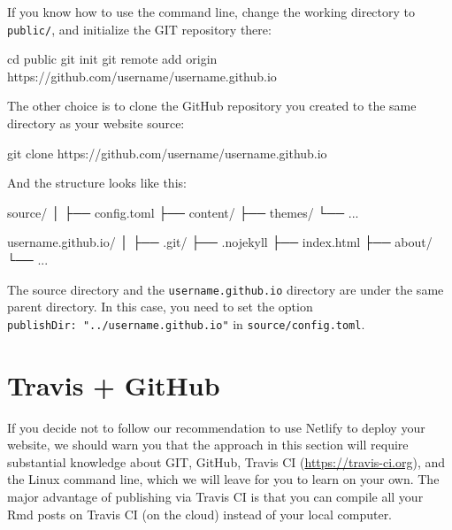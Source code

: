 \documentclass[12pt,]{krantz}
\makeatletter
\newenvironment{Shaded}{\begin{snugshade}}{\end{snugshade}}
\newcommand{\BuiltInTok}[1]{#1}
\newcommand{\ExtensionTok}[1]{#1}
\newcommand{\FunctionTok}[1]{\textcolor[rgb]{0.00,0.00,0.00}{#1}}
\newcommand{\NormalTok}[1]{#1}
\newenvironment{kframe}{%
\medskip{}
\setlength{\fboxsep}{.8em}
 \def\at@end@of@kframe{}%
 \ifinner\ifhmode%
  \def\at@end@of@kframe{\end{minipage}}%
  \begin{minipage}{\columnwidth}%
 \fi\fi%
 \def\FrameCommand##1{\hskip\@totalleftmargin \hskip-\fboxsep
 \colorbox{shadecolor}{##1}\hskip-\fboxsep
     \hskip-\linewidth \hskip-\@totalleftmargin \hskip\columnwidth}%
 \MakeFramed {\advance\hsize-\width
   \@totalleftmargin\z@ \linewidth\hsize
   \@setminipage}}%
 {\par\unskip\endMakeFramed%
 \at@end@of@kframe}
\renewenvironment{Shaded}{\begin{kframe}}{\end{kframe}}
\theoremstyle{definition}
\theoremstyle{definition}
\theoremstyle{definition}
\theoremstyle{remark}
\makeatother
\begin{document}
If you know how to use the command line, change the working directory to
\texttt{public/}, and initialize the GIT repository there:

\begin{Shaded}
\begin{Highlighting}[]
\BuiltInTok{cd}\NormalTok{ public}
\FunctionTok{git}\NormalTok{ init}
\FunctionTok{git}\NormalTok{ remote add origin https://github.com/username/username.github.io}
\end{Highlighting}
\end{Shaded}

The other choice is to clone the GitHub repository you created to the
same directory as your website source:

\begin{Shaded}
\begin{Highlighting}[]
\FunctionTok{git}\NormalTok{ clone https://github.com/username/username.github.io}
\end{Highlighting}
\end{Shaded}

And the structure looks like this:

\begin{Shaded}
\begin{Highlighting}[]
\ExtensionTok{source/}
\NormalTok{│}
\NormalTok{├── }\ExtensionTok{config.toml}
\NormalTok{├── }\ExtensionTok{content/}
\NormalTok{├── }\ExtensionTok{themes/}
\NormalTok{└── }\ExtensionTok{...}

\ExtensionTok{username.github.io/}
\NormalTok{│}
\NormalTok{├── }\ExtensionTok{.git/}
\NormalTok{├── }\ExtensionTok{.nojekyll}
\NormalTok{├── }\ExtensionTok{index.html}
\NormalTok{├── }\ExtensionTok{about/}
\NormalTok{└── }\ExtensionTok{...}
\end{Highlighting}
\end{Shaded}

The source directory and the \texttt{username.github.io} directory are
under the same parent directory. In this case, you need to set the
option \texttt{publishDir:\ "../username.github.io"} in
\texttt{source/config.toml}.

\hypertarget{travis-github}{%
\section{Travis + GitHub}\label{travis-github}}

If  you decide not to follow our recommendation to use
Netlify to deploy your website, we should warn you that the approach in
this section will require substantial knowledge about GIT, GitHub,
Travis CI (\url{https://travis-ci.org}), and the Linux command line,
which we will leave for you to learn on your own. The major advantage of
publishing via Travis CI is that you can compile all your Rmd posts on
Travis CI (on the cloud) instead of your local computer.
\end{document}
